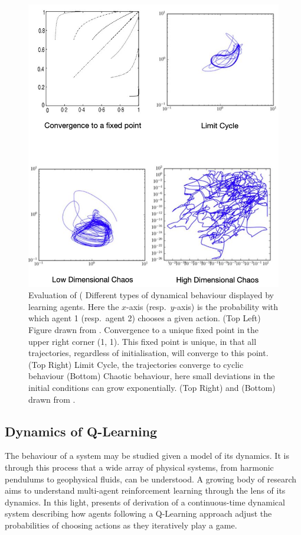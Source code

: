 \documentclass[sigconf,anonymous]{aamas}
\begin{document}
    \begin{figure}[t]
    \centering
    \includegraphics[width = 0.8 \linewidth]{Figures/DynamicalBehaviours.png}
    \caption{Evaluation of (\label{fig::DynamicalBehaviours} Different types of dynamical behaviour
       displayed
        by learning agents. Here the $x$-axis (resp.~$y$-axis) is the probability with which agent 1 (resp.~agent 2) chooses a given action. (Top Left) Figure drawn from \cite{Tuyls2006AnGames}.
        Convergence
        to a unique fixed point in the upper right corner (1, 1). This fixed point is unique, in
        that all trajectories, regardless of initialisation, will converge to this point. (Top Right) Limit Cycle, the trajectories converge to cyclic behaviour (Bottom)
        Chaotic behaviour, here small deviations in the initial conditions can grow
        exponentially. (Top Right) and (Bottom) drawn from \cite{Sanders2018}.}
\end{figure}

\subsection{Dynamics of Q-Learning}

The behaviour of a system may be studied given a model of its
dynamics. It is through this process that a wide array of physical
systems, from harmonic pendulums to geophysical fluids, can be
understood. A growing body of research aims to understand multi-agent
reinforcement learning through the lens of its dynamics. In this
light, \cite{Tuyls2006AnGames} presents of derivation of a continuous-time dynamical system describing how agents following a Q-Learning
approach adjust the probabilities of choosing actions as they
iteratively play a game. 
\end{document}
